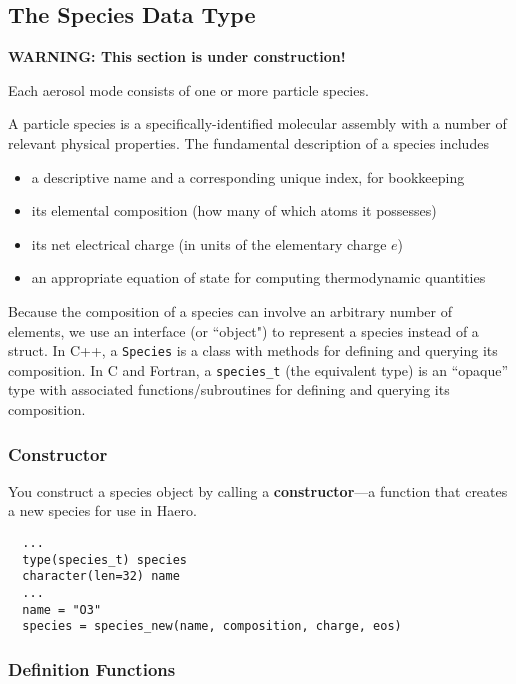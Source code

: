 \subsection{The Species Data Type}

{\bf WARNING: This section is under construction!}

Each aerosol mode consists of one or more particle species.

A particle species is a specifically-identified molecular assembly with
a number of relevant physical properties. The fundamental description of a
species includes

\begin{itemize}
  \item a descriptive name and a corresponding unique index, for bookkeeping
  \item its elemental composition (how many of which atoms it possesses)
  \item its net electrical charge (in units of the elementary charge $e$)
  \item an appropriate equation of state for computing thermodynamic quantities
\end{itemize}

Because the composition of a species can involve an arbitrary number of
elements, we use an interface (or ``object") to represent a species instead of
a struct. In C++, a \verb|Species| is a class with methods for defining and
querying its composition. In C and Fortran, a \verb|species_t| (the equivalent
type) is an ``opaque'' type with associated functions/subroutines for defining
and querying its composition.

\subsubsection*{Constructor}

You construct a species object by calling a {\bf constructor}---a
function that creates a new species for use in Haero.

\begin{verbatim}
  ...
  type(species_t) species
  character(len=32) name
  ...
  name = "O3"
  species = species_new(name, composition, charge, eos)

\end{verbatim}

\subsubsection*{Definition Functions}

